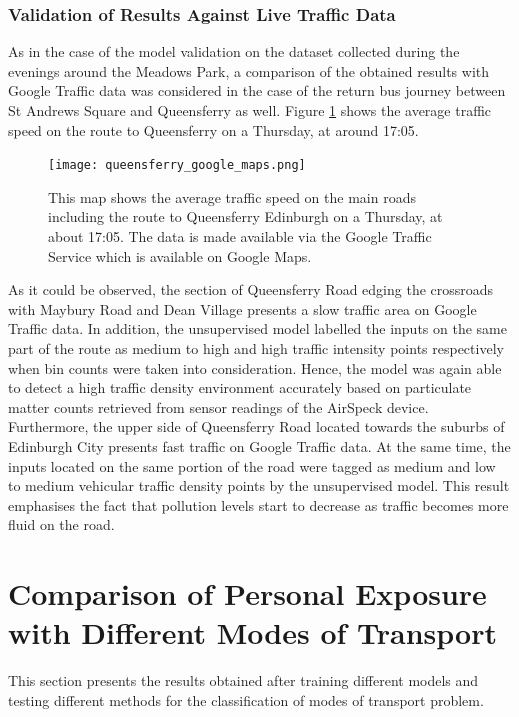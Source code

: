 \documentclass[bsc,frontabs,twoside,singlespacing, parskip,deptreport]{infthesis}     %
\begin{document}
\subsubsection*{Validation of Results Against Live Traffic Data}

As in the case of the model validation on the dataset collected during the evenings around the Meadows Park, a comparison of the obtained results with Google Traffic data was considered in the case of the return bus journey between St Andrews Square and Queensferry as well. Figure \ref{fig:queensferry-google-maps} shows the average traffic speed on the route to Queensferry on a Thursday, at around 17:05.

\begin{figure}[h!]
  \center
  \texttt{[image: queensferry\_google\_maps.png]}
  \caption{This map shows the average traffic speed on the main roads including the route to Queensferry Edinburgh on a Thursday, at about 17:05. The data is made available via the Google Traffic Service which is available on Google Maps.}
  \label{fig:queensferry-google-maps}
\end{figure}

As it could be observed, the section of Queensferry Road edging the crossroads with Maybury Road and Dean Village presents a slow traffic area on Google Traffic data. In addition, the unsupervised model labelled the inputs on the same part of the route as medium to high and high traffic intensity points respectively when bin counts were taken into consideration. Hence, the model was again able to detect a high traffic density environment accurately based on particulate matter counts retrieved from sensor readings of the AirSpeck device. Furthermore, the upper side of Queensferry Road located towards the suburbs of Edinburgh City presents fast traffic on Google Traffic data. At the same time, the inputs located on the same portion of the road were tagged as medium and low to medium vehicular traffic density points by the unsupervised model. This result emphasises the fact that pollution levels start to decrease as traffic becomes more fluid on the road.


\section{Comparison of Personal Exposure with Different Modes of Transport}

This section presents the results obtained after training different models and testing different methods for the classification of modes of transport problem.
\end{document}
